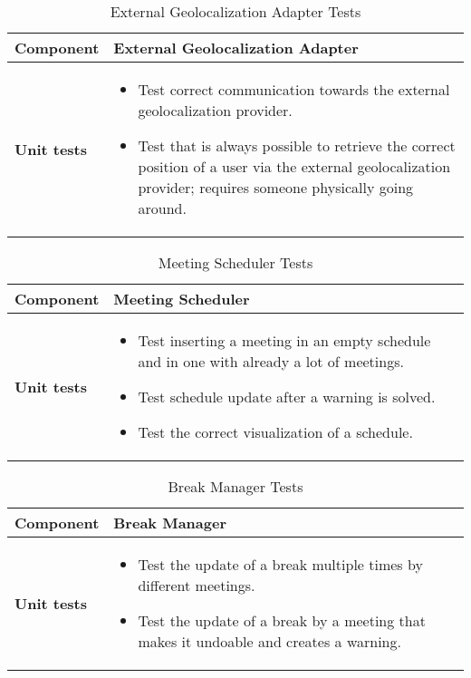 \begin{table}[H]	
	\centering
	\def\arraystretch{1.5}
	\begin{tabular}{|m{4cm}|m{12cm}|}
		\hline
		\textbf{Component} & External Geolocalization Adapter \\ \hline
		\textbf{Unit tests} & 
			\begin{itemize}
			\item Test correct communication towards the external geolocalization provider.
			\item Test that is always possible to retrieve the correct position of a user via the external geolocalization provider; requires someone physically going around.
			\end{itemize} \\ \hline
	\end{tabular}
	\caption{External Geolocalization Adapter Tests}
\end{table}

\begin{table}[H]	
	\centering
	\def\arraystretch{1.5}
	\begin{tabular}{|m{4cm}|m{12cm}|}
		\hline
		\textbf{Component} & Meeting Scheduler \\ \hline
		\textbf{Unit tests} & 
			\begin{itemize}
			\item Test inserting a meeting in an empty schedule and in one with already a lot of meetings.
			\item Test schedule update after a warning is solved.
			\item Test the correct visualization of a schedule.
			\end{itemize} \\ \hline
	\end{tabular}
	\caption{Meeting Scheduler Tests}
\end{table}

\begin{table}[H]	
	\centering
	\def\arraystretch{1.5}
	\begin{tabular}{|m{4cm}|m{12cm}|}
		\hline
		\textbf{Component} & Break Manager \\ \hline
		\textbf{Unit tests} & 
			\begin{itemize}
			\item Test the update of a break multiple times by different meetings.
			\item Test the update of a break by a meeting that makes it undoable and creates a warning.
			\end{itemize} \\ \hline
	\end{tabular}
	\caption{Break Manager Tests}
\end{table}

